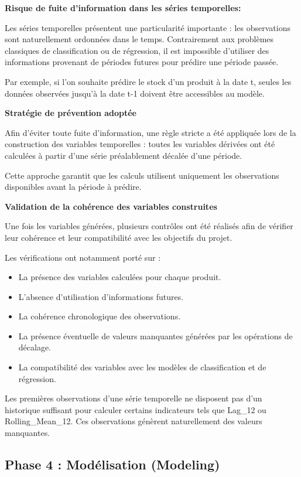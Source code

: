 \textbf{Risque de fuite d'information dans les séries temporelles:}
 
Les séries temporelles présentent une particularité importante : les observations sont naturellement ordonnées dans le temps. Contrairement aux problèmes classiques de classification ou de régression, il est impossible d'utiliser des informations provenant de périodes futures pour prédire une période passée.
 
Par exemple, si l'on souhaite prédire le stock d'un produit à la date t, seules les données observées jusqu'à la date t-1 doivent être accessibles au modèle.
 
\textbf{Stratégie de prévention adoptée}
 
Afin d'éviter toute fuite d'information, une règle stricte a été appliquée lors de la construction des variables temporelles : toutes les variables dérivées ont été calculées à partir d'une série préalablement décalée d'une période.
 
Cette approche garantit que les calculs utilisent uniquement les observations disponibles avant la période à prédire.
 
\textbf{Validation de la cohérence des variables construites}
 
Une fois les variables générées, plusieurs contrôles ont été réalisés afin de vérifier leur cohérence et leur compatibilité avec les objectifs du projet.
 
Les vérifications ont notamment porté sur :
 
\begin{itemize}
    \item La présence des variables calculées pour chaque produit.
    \item L'absence d'utilisation d'informations futures.
    \item La cohérence chronologique des observations.
    \item La présence éventuelle de valeurs manquantes générées par les opérations de décalage.
    \item La compatibilité des variables avec les modèles de classification et de régression.
\end{itemize}
 
Les premières observations d'une série temporelle ne disposent pas d'un historique suffisant pour calculer certains indicateurs tels que Lag\_12 ou Rolling\_Mean\_12. Ces observations génèrent naturellement des valeurs manquantes.
 
\subsection{Phase 4 : Modélisation (Modeling)}
 
